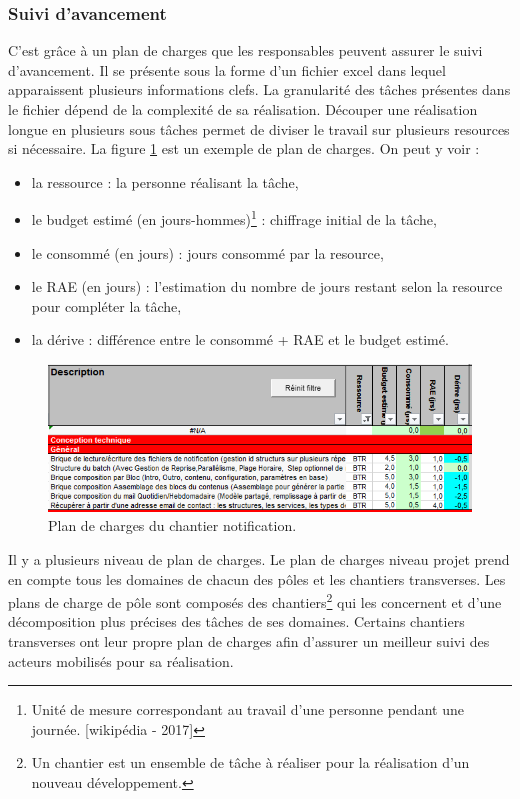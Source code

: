 \documentclass[12pt,a4paper]{article}
\begin{document}
\subsubsection{Suivi d’avancement}
C'est grâce à un plan de charges que les responsables peuvent assurer le suivi d'avancement. Il se présente sous la forme d'un fichier excel dans lequel apparaissent plusieurs informations clefs. La granularité des tâches présentes dans le fichier dépend de la complexité de sa réalisation. Découper une réalisation longue en plusieurs sous tâches permet de diviser le travail sur plusieurs resources si nécessaire. La figure \ref{pdc} est un exemple de plan de charges.
\newpage
On peut  y voir :
\begin{itemize}
\item la ressource : la personne réalisant la tâche,
\item le budget estimé (en jours-hommes)\footnote{Unité de mesure correspondant au travail d’une personne pendant une journée. [wikipédia - 2017]} : chiffrage initial de la tâche,
\item le consommé (en jours) : jours consommé par la resource,
\item le \gls{RAE} (en jours) : l'estimation du nombre de jours restant selon la resource pour compléter la tâche,
\item la dérive : différence entre le consommé + \gls{RAE} et le budget estimé.
\end{itemize}
\begin{figure}[H]
	\begin{center}
		\includegraphics[width=\textwidth,height=\textheight,keepaspectratio]{planDeCharge.png}
		\caption{Plan de charges du chantier notification.}
		\label{pdc}
	\end{center}
\end{figure}
Il y a plusieurs niveau de plan de charges. Le plan de charges niveau projet prend en compte tous les domaines de chacun des pôles et les chantiers transverses. Les plans de charge de pôle sont composés des chantiers\footnote{Un chantier est un ensemble de tâche à réaliser pour la réalisation d'un nouveau développement.} qui les concernent et d'une décomposition plus précises des tâches de ses domaines. Certains chantiers transverses ont leur propre plan de charges afin d'assurer un meilleur suivi des acteurs mobilisés pour sa réalisation.
\end{document}
